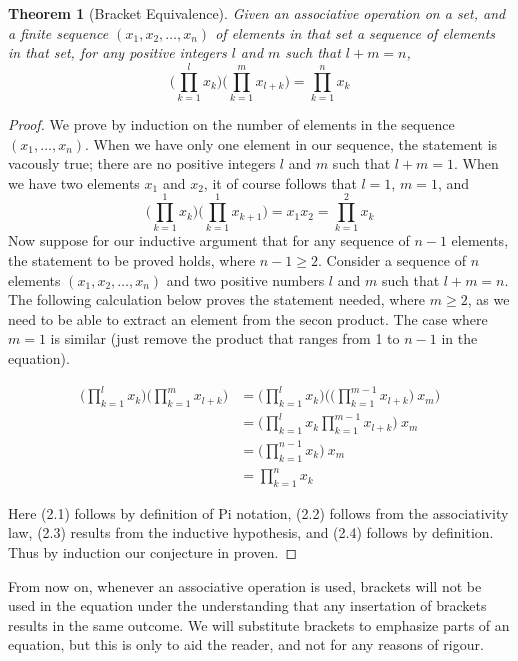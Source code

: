 \documentclass[12pt]{report}
\newtheorem{theorem}{Theorem}[section]
\begin{document}
\begin{theorem}[Bracket Equivalence]
Given an associative operation on a set, and a finite sequence $(x_1, x_2, \dots, x_n)$ of elements in that set a sequence of elements in that set, for any positive integers $l$ and $m$ such that $l + m = n$,
\[ \big( \prod_{k=1}^l x_k \big) \big( \prod_{k=1}^m x_{l + k} \big) = \prod_{k=1}^n x_k \]
\end{theorem}
\begin{proof}
    We prove by induction on the number of elements in the sequence $(x_1, \dots, x_n)$. When we have only one element in our sequence, the statement is vacously true; there are no positive integers $l$ and $m$ such that $l + m = 1$. When we have two elements $x_1$ and $x_2$, it of course follows that $l = 1$, $m = 1$, and
    \[ \big( \prod_{k=1}^1 x_k \big) \big( \prod_{k=1}^1 x_{k+1} \big) = x_1 x_2 = \prod_{k=1}^2 x_k \]
    Now suppose for our inductive argument that for any sequence of $n-1$ elements, the statement to be proved holds, where $n-1 \geq 2$. Consider a sequence of $n$ elements $(x_1, x_2, \dots, x_n)$ and two positive numbers $l$ and $m$ such that $l + m = n$. The following calculation below proves the statement needed, where $m \geq 2$, as we need to be able to extract an element from the secon product. The case where $m = 1$ is similar (just remove the product that ranges from 1 to $n-1$ in the equation).

    \begin{align}
        \big( \prod_{k=1}^l x_k \big) \big( \prod_{k=1}^m x_{l + k} \big) &= \big( \prod_{k=1}^l x_k \big) \big( \big( \prod_{k=1}^{m-1} x_{l + k} \big)\ x_m \big)\\
        &= \big( \prod_{k=1}^l x_k \prod_{k=1}^{m-1} x_{l + k} \big)\ x_m\\
        &= \big( \prod_{k=1}^{n-1} x_k \big)\ x_m\\
        &= \prod_{k=1}^n x_k
    \end{align}

    Here (2.1) follows by definition of Pi notation, (2.2) follows from the associativity law, (2.3) results from the inductive hypothesis, and (2.4) follows by definition. Thus by induction our conjecture in proven.
\end{proof}

From now on, whenever an associative operation is used, brackets will not be used in the equation under the understanding that any insertation of brackets results in the same outcome. We will substitute brackets to emphasize parts of an equation, but this is only to aid the reader, and not for any reasons of rigour.
\end{document}
